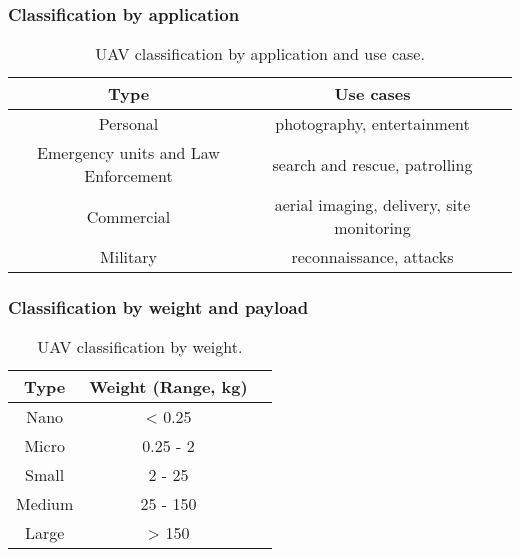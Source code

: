 


\subsubsection*{Classification by application}

\begin{table}[H]
    \centering
    \begin{tabular}{|c|c|c|}
        \hline
        Type                                & Use cases                                 \\
        \hline\hline
        Personal                            & photography, entertainment                \\
        \hline
        Emergency units and Law Enforcement & search and rescue, patrolling             \\
        \hline
        Commercial                          & aerial imaging, delivery, site monitoring \\
        \hline
        Military                            & reconnaissance, attacks                   \\
        \hline
    \end{tabular}
    \caption{UAV classification by application and use case. \cite{Chamola2021}}
    \label{table:uav-classification-by-application}
\end{table}




\subsubsection*{Classification by weight and payload}

\begin{table}[H]
    \centering
    \begin{tabular}{|c|c|c|}
        \hline
        Type   & Weight (Range, kg) \\
        \hline\hline
        Nano   & < 0.25             \\
        \hline
        Micro  & 0.25 - 2           \\
        \hline
        Small  & 2 - 25             \\
        \hline
        Medium & 25 - 150           \\
        \hline
        Large  & > 150              \\
        \hline
    \end{tabular}
    \caption{UAV classification by weight. \cite{Chamola2021}}
    \label{table:uav-classification-by-weight}
\end{table}


